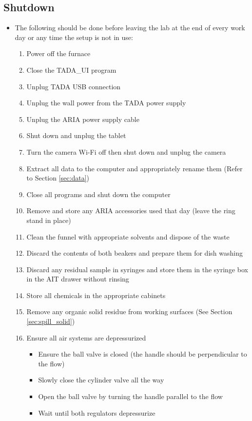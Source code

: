 \documentclass[letterpaper,11pt]{article}
\begin{document}
    
\subsection{Shutdown}
    \begin{itemize}
    \item The following should be done before leaving the lab at the end of 
        every work day or any time the setup is not in use:
        \begin{enumerate}
        \item Power off the furnace
        \item Close the TADA\_UI program
        \item Unplug TADA USB connection
        \item Unplug the wall power from the TADA power supply
        \item Unplug the ARIA power supply cable
        \item Shut down and unplug the tablet
        \item Turn the camera Wi-Fi off then shut down and unplug the camera
        \item Extract all data to the computer and appropriately rename them 
            (Refer to Section \ref{sec:data})
        \item Close all programs and shut down the computer
        
        \item Remove and store any ARIA accessories used that day (leave the 
            ring stand in place)
        \item Clean the funnel with appropriate solvents and dispose of the waste
        \item Discard the contents of both beakers and prepare them for dish washing
        \item Discard any residual sample in syringes and store them in the syringe box in the AIT
            drawer without rinsing %
        \item Store all chemicals in the appropriate cabinets
        \item Remove any organic solid residue from working surfaces 
            (See Section \ref{sec:spill_solid})
		
		\item Ensure all air systems are depressurized 
			\begin{itemize}
			\item Ensure the ball valve is closed (the handle should be perpendicular to the flow)
			\item Slowly close the cylinder valve all the way
			\item Open the ball valve by turning the handle parallel to the flow
            \item Wait until both regulators depressurize
			\end{itemize}
        \end{enumerate}
    

\end{itemize}
\end{document}

